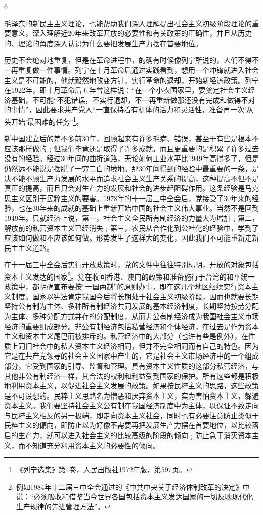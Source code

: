 \documentclass[UTF8, 12pt, a4paper]{ctexrep}
\begin{document}
6

毛泽东的新民主主义理论，也能帮助我们深入理解提出社会主义初级阶段理论的重要意义，深入理解近20年来改革开放的必要性和有关政策的正确性，并且从历史的、理论的角度深入认识为什么要把发展生产力摆在首要地位。

历史不会绝对地重复，但是在革命进程中，的确有时候像列宁所说的，人们不得不一再重复做一件事情。列宁在十月革命后通过实践看到，想用一个冲锋就进入社会主义是不可能的，他就毅然地改变方针，实行革命的退却，开始新经济政策。列宁在1922年，即十月革命后五年曾这样说：“在一个小农国家里，要奠定社会主义经济基础，不可能“不犯错误，不实行退却，不一再重新做那还没有完成和做得不对的事情”，因此要求共产党人“一直保持着有机体的活力和灵活性，准备再一次‘从头开始’最困难的任务”\footnote{《列宁选集》第4卷，人民出版社1972年版，第597页。}。

新中国建立后的差不多前30年，回顾起来有许多毛病、错误，甚至于有些是根本不应该那样做的﹔但我们毕竟还是取得了许多成就，而且更重要的是积累了许多过去没有的经验。经过30年间的曲折道路，无论如何工业水平比1949年高得多了，但是仍然远不能说是摆脱了一穷二白的境地。那30年间得到的经验中最重要的一条，是决不能不顾生产力发展的水平而追求社会主义生产关系的提高，这种提高不但不是真正的提高，而且只会对生产力的发展和社会的进步起阻碍作用。这条经验是马克思主义区别于民粹主义的要害。1978年的十一届三中全会后，党接受了30年来的经验，也在30年来的成就的基础上重新开始中国的社会主义伟大事业。当然不是回到1949年。只就经济上说，第一，社会主义全民所有制经济的力量大为增加﹔第二，解放前的私营资本主义已经消失﹔第三，农民从合作化到公社化的经验中，学到了应该如何做和不应该如何做。形势发生了这样大的变化，因此我们不可能重新走新民主主义道路。

在十一届三中全会后实行开放政策时，党的文件中往往特别标明，开放的对象包括资本主义发达的国家\footnote{例如1984年十二届三中全会通过的《中共中央关于经济体制改革的决定》中说：“必须吸收和借鉴当今世界各国包括资本主义发达国家的一切反映现代化生产规律的先进管理方法”。}。党在收回香港、澳门的政策和准备施行于台湾的和平统一政策中，都明确宣布要按“一国两制”的原则办事，即在这几个地区继续实行资本主义制度。国家以宪法肯定我国今后将长期处于社会主义初级阶段，因而也就要长期坚持公有制为主体、多种所有制经济共同发展的基本经济制度，长期坚持按劳分配为主体、多种分配方式并存的分配制度，从而非公有制经济成为我国社会主义市场经济的重要组成部分。非公有制经济包括私营经济和个体经济，在过去是作为资本主义和资本主义尾巴而被排斥的。私营经济中的大部分（也许有些是例外），在性质上同旧社会中的私人资本主义经济相同，但并不完全相同而有自己的特色。因为它是在共产党领导的社会主义国家中产生的，它是社会主义市场经济中的一个组成部分，它受到国家的引导、监督和管理。具有资本主义性质的这部分私营经济，与其他非公有制经济一样，其合法的权利和利益受到国家的保护。所有这些都是积极地利用资本主义，以促进社会主义发展的政策。如果按民粹主义的思路，这些政策是不可设想的。民粹主义思路名为憎恶和厌弃资本主义，实为害怕资本主义，躲避资本主义。我们要坚持社会主义公有制在我国经济制度中为主体，以保证不致走向与民粹主义相反的另一极端，即走向资本主义社会，同时也有必要注意防止类似于民粹主义的偏向，即防止以为好像不需要再把发展生产力摆在首要地位，以比较落后的生产力，就可以进入社会主义的比较高级的阶段的倾向﹔防止急于消灭资本主义，而不知道充分利用资本主义的必要性的倾向。
\end{document}
